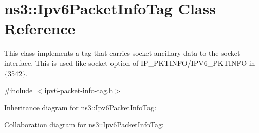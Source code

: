 \hypertarget{classns3_1_1Ipv6PacketInfoTag}{}\section{ns3\+:\+:Ipv6\+Packet\+Info\+Tag Class Reference}
\label{classns3_1_1Ipv6PacketInfoTag}


This class implements a tag that carries socket ancillary data to the socket interface. This is used like socket option of I\+P\+\_\+\+P\+K\+T\+I\+N\+F\+O/\+I\+P\+V6\+\_\+\+P\+K\+T\+I\+N\+FO in \{3542\}.  




{\ttfamily \#include $<$ipv6-\/packet-\/info-\/tag.\+h$>$}



Inheritance diagram for ns3\+:\+:Ipv6\+Packet\+Info\+Tag\+:


Collaboration diagram for ns3\+:\+:Ipv6\+Packet\+Info\+Tag\+:
